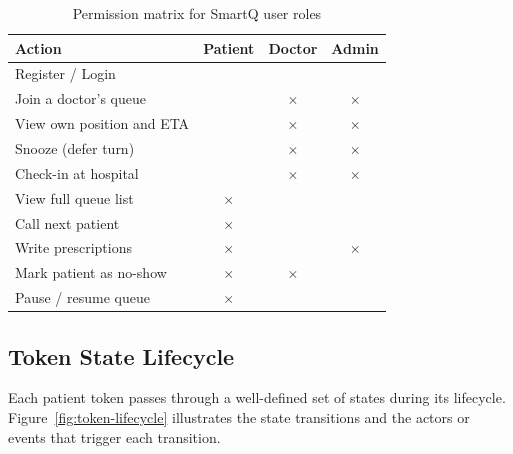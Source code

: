 \documentclass[12pt,a4paper]{article}
\newcommand{\cmark}{\textcolor{green!60!black}{\checkmark}}
\newcommand{\xmark}{\textcolor{red!70!black}{$\times$}}
\begin{document}
\begin{table}[H]
\centering
\caption{Permission matrix for SmartQ user roles}
\label{tab:permissions}
\small
\begin{tabularx}{\textwidth}{X c c c}
\toprule
\textbf{Action} & \textbf{Patient} & \textbf{Doctor} & \textbf{Admin} \\
\midrule
Register / Login & \cmark & \cmark & \cmark \\
Join a doctor's queue & \cmark & \xmark & \xmark \\
View own position and ETA & \cmark & \xmark & \xmark \\
Snooze (defer turn) & \cmark & \xmark & \xmark \\
Check-in at hospital & \cmark & \xmark & \xmark \\
View full queue list & \xmark & \cmark & \cmark \\
Call next patient & \xmark & \cmark & \cmark \\
Write prescriptions & \xmark & \cmark & \xmark \\
Mark patient as no-show & \xmark & \xmark & \cmark \\
Pause / resume queue & \xmark & \cmark & \cmark \\
\bottomrule
\end{tabularx}
\end{table}

\subsection{Token State Lifecycle}

Each patient token passes through a well-defined set of states during its lifecycle. Figure~\ref{fig:token-lifecycle} illustrates the state transitions and the actors or events that trigger each transition.
\end{document}
